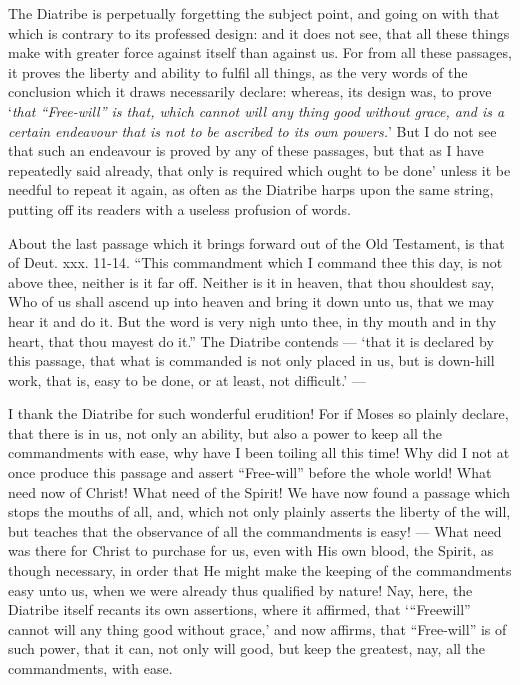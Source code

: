 The Diatribe is perpetually forgetting the subject point, and going on with that which is contrary to its professed design: and it does not see, that all these things make with greater force against itself than against us. For from all these passages, it proves the liberty and ability to fulfil all things, as the very words of the conclusion which it draws necessarily declare: whereas, its design was, to prove ‘\emph{that “Free-will” is that, which cannot will any thing good without grace, and is a certain endeavour that is not to be ascribed to its own powers.}’ But I do not see that such an endeavour is proved by any of these passages, but that as I have repeatedly said already, that only is required which ought to be done’ unless it be needful to repeat it again, as often as the Diatribe harps upon the same string, putting off its readers with a useless profusion of words.

About the last passage which it brings forward out of the Old Testament, is that of Deut. xxx. 11-14. “This commandment which I command thee this day, is not above thee, neither is it far off. Neither is it in heaven, that thou shouldest say, Who of us shall ascend up into heaven and bring it down unto us, that we may hear it and do it. But the word is very nigh unto thee, in thy mouth and in thy heart, that thou mayest do it.” The Diatribe contends — ‘that it is declared by this passage, that what is commanded is not only placed in us, but is down-hill work, that is, easy to be done, or at least, not difficult.’ —

I thank the Diatribe for such wonderful erudition! For if Moses so plainly declare, that there is in us, not only an ability, but also a power to keep all the commandments with ease, why have I been toiling all this time! Why did I not at once produce this passage and assert “Free-will” before the whole world! What need now of Christ! What need of the Spirit! We have now found a passage which stops the mouths of all, and, which not only plainly asserts the liberty of the will, but teaches that the observance of all the commandments is easy! — What need was there for Christ to purchase for us, even with His own blood, the Spirit, as though necessary, in order that He might make the keeping of the commandments easy unto us, when we were already thus qualified by nature! Nay, here, the Diatribe itself recants its own assertions, where it affirmed, that ‘“Freewill” cannot will any thing good without grace,’ and now affirms, that “Free-will” is of such power, that it can, not only will good, but keep the greatest, nay, all the commandments, with ease.

